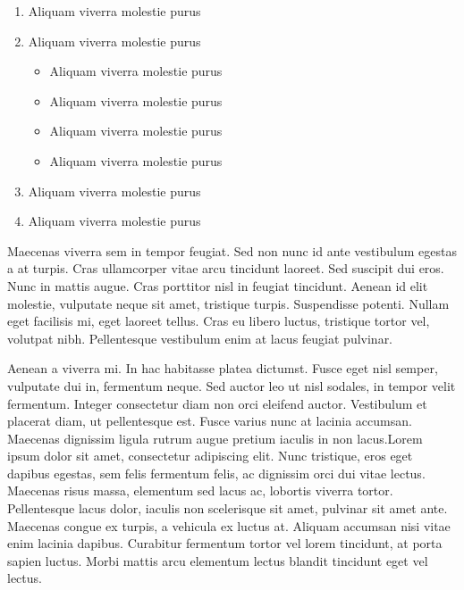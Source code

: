 \documentclass{report}
\begin{document}
\begin{enumerate}[label=$\infty$ \arabic*)]
	\item Aliquam viverra molestie purus
	\item Aliquam viverra molestie purus
\begin{itemize}[label=\bcsmbh]
	\item Aliquam viverra molestie purus
	\item Aliquam viverra molestie purus
	\item Aliquam viverra molestie purus
	\item Aliquam viverra molestie purus
\end{itemize}
	\item Aliquam viverra molestie purus
	\item Aliquam viverra molestie purus
\end{enumerate}
	
Maecenas viverra sem in tempor feugiat. Sed non nunc id ante vestibulum egestas a at turpis. Cras ullamcorper vitae arcu tincidunt laoreet. Sed suscipit dui eros. Nunc in mattis augue. Cras porttitor nisl in feugiat tincidunt. Aenean id elit molestie, vulputate neque sit amet, tristique turpis. Suspendisse potenti. Nullam eget facilisis mi, eget laoreet tellus. Cras eu libero luctus, tristique tortor vel, volutpat nibh. Pellentesque vestibulum enim at lacus feugiat pulvinar.
\newline

Aenean a viverra mi. In hac habitasse platea dictumst. Fusce eget nisl semper, vulputate dui in, fermentum neque. Sed auctor leo ut nisl sodales, in tempor velit fermentum. Integer consectetur diam non orci eleifend auctor. Vestibulum et placerat diam, ut pellentesque est. Fusce varius nunc at lacinia accumsan. Maecenas dignissim ligula rutrum augue pretium iaculis in non lacus.Lorem ipsum dolor sit amet, consectetur adipiscing elit. Nunc tristique, eros eget dapibus egestas, sem felis fermentum felis, ac dignissim orci dui vitae lectus. Maecenas risus massa, elementum sed lacus ac, lobortis viverra tortor. Pellentesque lacus dolor, iaculis non scelerisque sit amet, pulvinar sit amet ante. Maecenas congue ex turpis, a vehicula ex luctus at. Aliquam accumsan nisi vitae enim lacinia dapibus. Curabitur fermentum tortor vel lorem tincidunt, at porta sapien luctus. Morbi mattis arcu elementum lectus blandit tincidunt eget vel lectus.
\end{document}
